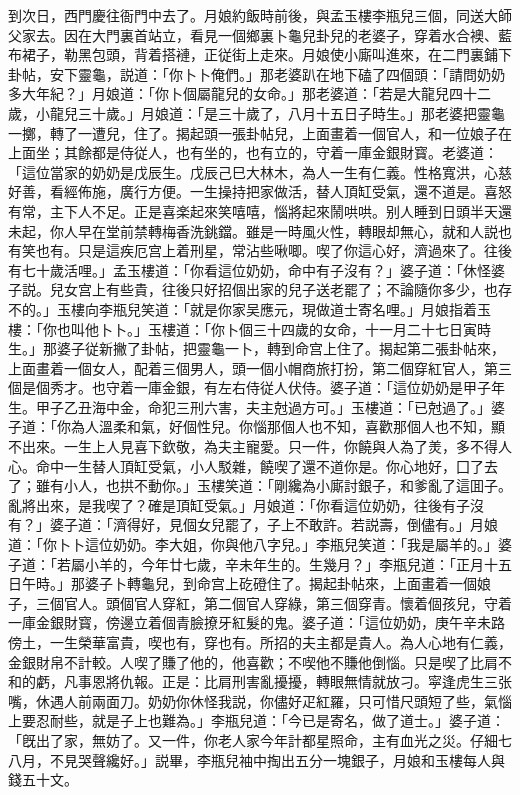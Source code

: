 到次日，西門慶往衙門中去了。月娘約飯時前後，與孟玉樓李瓶兒三個，同送大師父家去。因在大門裏首站立，看見一個鄉裏卜龜兒卦兒的老婆子，穿着水合襖、藍布裙子，勒黑包頭，背着搭褳，正従街上走來。月娘使小廝叫進來，在二門裏鋪下卦帖，安下靈龜，説道：「你卜卜俺們。」那老婆趴在地下磕了四個頭：「請問奶奶多大年紀？」月娘道：「你卜個屬龍兒的女命。」那老婆道：「若是大龍兒四十二歲，小龍兒三十歲。」月娘道：「是三十歲了，八月十五日子時生。」那老婆把靈龜一擲，轉了一遭兒，住了。揭起頭一張卦帖兒，上面畫着一個官人，和一位娘子在上面坐；其餘都是侍従人，也有坐的，也有立的，守着一庫金銀財寳。老婆道：「這位當家的奶奶是戊辰生。戊辰己巳大林木，為人一生有仁義。性格寬洪，心慈好善，看經佈施，廣行方便。一生操持把家做活，替人頂缸受氣，還不道是。喜怒有常，主下人不足。正是喜楽起來笑嘻嘻，惱將起來鬧哄哄。别人睡到日頭半天還未起，你人早在堂前禁轉梅香洗銚鐺。雖是一時風火性，轉眼却無心，就和人説也有笑也有。只是這疾厄宫上着刑星，常沾些啾唧。喫了你這心好，濟過來了。往後有七十歲活哩。」孟玉樓道：「你看這位奶奶，命中有子沒有？」婆子道：「休怪婆子説。兒女宫上有些貴，往後只好招個出家的兒子送老罷了；不論隨你多少，也存不的。」玉樓向李瓶兒笑道：「就是你家吴應元，現做道士寄名哩。」月娘指着玉樓：「你也叫他卜卜。」玉樓道：「你卜個三十四歲的女命，十一月二十七日寅時生。」那婆子従新撇了卦帖，把靈龜一卜，轉到命宫上住了。揭起第二張卦帖來，上面畫着一個女人，配着三個男人，頭一個小帽商旅打扮，第二個穿紅官人，第三個是個秀才。也守着一庫金銀，有左右侍従人伏侍。婆子道：「這位奶奶是甲子年生。甲子乙丑海中金，命犯三刑六害，夫主尅過方可。」玉樓道：「已尅過了。」婆子道：「你為人溫柔和氣，好個性兒。你惱那個人也不知，喜歡那個人也不知，顯不出來。一生上人見喜下欽敬，為夫主寵愛。只一件，你饒與人為了羙，多不得人心。命中一生替人頂缸受氣，小人駁雜，饒喫了還不道你是。你心地好，囗了去了；雖有小人，也拱不動你。」玉樓笑道：「剛纔為小廝討銀子，和爹亂了這囬子。亂將出來，是我喫了？確是頂缸受氣。」月娘道：「你看這位奶奶，往後有子沒有？」婆子道：「濟得好，見個女兒罷了，子上不敢許。若説壽，倒儘有。」月娘道：「你卜卜這位奶奶。李大姐，你與他八字兒。」李瓶兒笑道：「我是屬羊的。」婆子道：「若屬小羊的，今年廿七歲，辛未年生的。生幾月？」李瓶兒道：「正月十五日午時。」那婆子卜轉龜兒，到命宫上矻磴住了。揭起卦帖來，上面畫着一個娘子，三個官人。頭個官人穿紅，第二個官人穿綠，第三個穿青。懷着個孩兒，守着一庫金銀財寳，傍邊立着個青臉撩牙紅髮的鬼。婆子道：「這位奶奶，庚午辛未路傍土，一生榮華富貴，喫也有，穿也有。所招的夫主都是貴人。為人心地有仁義，金銀財帛不計較。人喫了賺了他的，他喜歡；不喫他不賺他倒惱。只是喫了比肩不和的虧，凡事恩將仇報。正是：比肩刑害亂擾擾，轉眼無情就放刁。寜逢虎生三张嘴，休遇人前兩面刀。奶奶你休怪我説，你儘好疋紅羅，只可惜尺頭短了些，氣惱上要忍耐些，就是子上也難為。」李瓶兒道：「今已是寄名，做了道士。」婆子道：「旣出了家，無妨了。又一件，你老人家今年計都星照命，主有血光之災。仔細七八月，不見哭聲纔好。」説畢，李瓶兒袖中掏出五分一塊銀子，月娘和玉樓每人與錢五十文。

